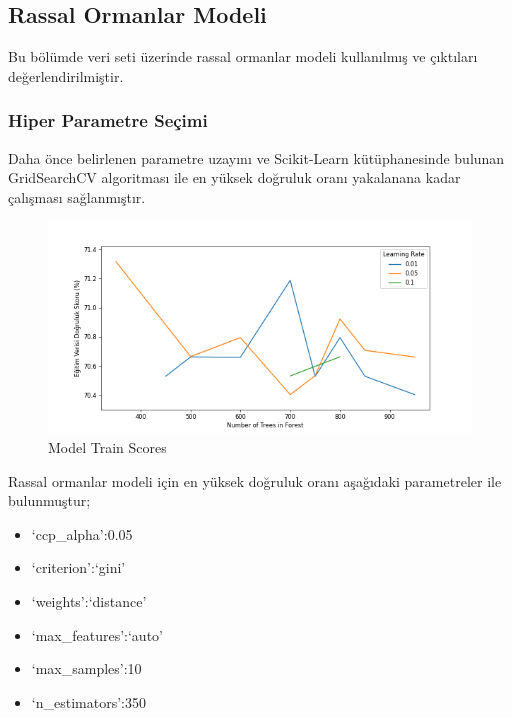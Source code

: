\documentclass[12pt,twoside]{deuthesis}
\providecommand{\tightlist}{%
  \setlength{\itemsep}{0pt}\setlength{\parskip}{0pt}}
\begin{document}
\hypertarget{mult_rf}{%
\subsection{Rassal Ormanlar Modeli}\label{mult_rf}}

Bu bölümde veri seti üzerinde rassal ormanlar modeli kullanılmış ve çıktıları değerlendirilmiştir.

\hypertarget{hiper-parametre-seuxe7imi-1}{%
\subsubsection{Hiper Parametre Seçimi}\label{hiper-parametre-seuxe7imi-1}}

Daha önce belirlenen parametre uzayını ve Scikit-Learn kütüphanesinde bulunan GridSearchCV algoritması ile en yüksek doğruluk oranı yakalanana kadar çalışması sağlanmıştır.
\begin{figure}

{\centering \includegraphics[width=1.1\linewidth,height=0.5\textheight]{figure/RF_Grid_Graph} 

}

\caption{Model Train Scores}\label{fig:unnamed-chunk-22}
\end{figure}
Rassal ormanlar modeli için en yüksek doğruluk oranı aşağıdaki parametreler ile bulunmuştur;
\begin{itemize}
\tightlist
\item
  `ccp\_alpha':0.05
\item
  `criterion':`gini'
\item
  `weights':`distance'
\item
  `max\_features':`auto'
\item
  `max\_samples':10
\item
  `n\_estimators':350
\end{itemize}
\newpage
\end{document}
